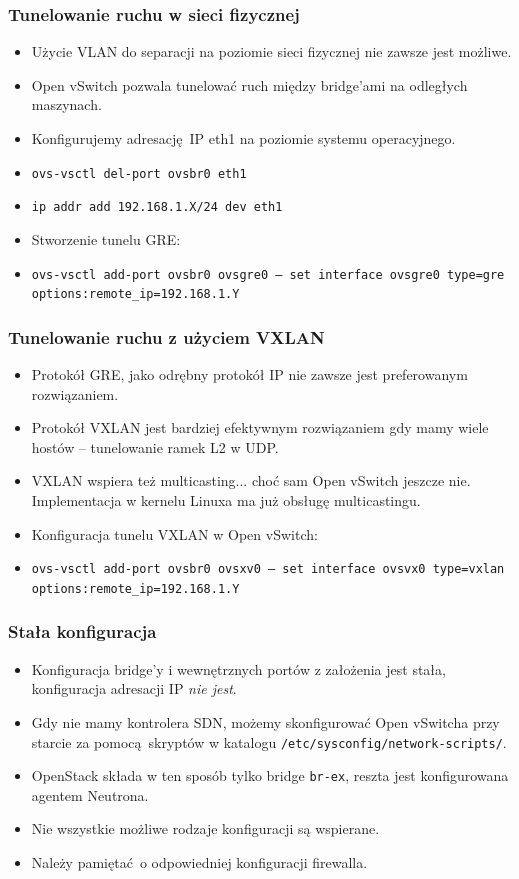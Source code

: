 \documentclass[dvipsnames,table]{beamer}
\begin{document}
\begin{frame}
\frametitle{Tunelowanie ruchu w sieci fizycznej}
\begin{itemize}
	\item Użycie VLAN do separacji na poziomie sieci fizycznej nie zawsze jest możliwe.
	\item Open vSwitch pozwala tunelować ruch między bridge'ami na odległych maszynach.
	\item Konfigurujemy adresację IP eth1 na poziomie systemu operacyjnego.
	\item {\tt ovs-vsctl del-port ovsbr0 eth1}
	\item {\tt ip addr add 192.168.1.X/24 dev eth1}
	\item Stworzenie tunelu GRE:
	\item {\tt ovs-vsctl add-port ovsbr0 ovsgre0 -- set interface ovsgre0 type=gre options:remote\_ip=192.168.1.Y}
\end{itemize}
\end{frame}

\begin{frame}
\frametitle{Tunelowanie ruchu z użyciem VXLAN}
\begin{itemize}
	\item Protokół GRE, jako odrębny protokół IP nie zawsze jest preferowanym rozwiązaniem.
	\item Protokół VXLAN jest bardziej efektywnym rozwiązaniem gdy mamy wiele hostów -- tunelowanie ramek L2 w UDP.
	\item VXLAN wspiera też multicasting... choć sam Open vSwitch jeszcze nie. Implementacja w kernelu Linuxa ma już obsługę multicastingu.
	\item Konfiguracja tunelu VXLAN w Open vSwitch:
	\item {\tt ovs-vsctl add-port ovsbr0 ovsxv0 -- set interface ovsvx0 type=vxlan options:remote\_ip=192.168.1.Y}
\end{itemize}

\end{frame}

\begin{frame}
\frametitle{Stała konfiguracja}
\begin{itemize}
	\item Konfiguracja bridge'y i wewnętrznych portów z założenia jest stała, konfiguracja adresacji IP {\em nie jest}.
	\item Gdy nie mamy kontrolera SDN, możemy skonfigurować Open vSwitcha przy starcie za pomocą skryptów w katalogu {\tt /etc/sysconfig/network-scripts/}.
	\item OpenStack składa w ten sposób tylko bridge {\tt br-ex}, reszta jest konfigurowana agentem Neutrona. 
	\item Nie wszystkie możliwe rodzaje konfiguracji są wspierane.
	\item Należy pamiętać o odpowiedniej konfiguracji firewalla.
\end{itemize}
\end{frame}
\end{document}
